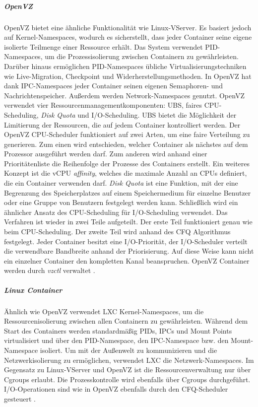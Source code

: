 \subparagraph{OpenVZ}
OpenVZ bietet eine ähnliche Funktionalität wie Linux-VServer. Es basiert jedoch auf Kernel-Namespaces, wodurch es sicherstellt, dass jeder Container seine eigene isolierte Teilmenge einer Ressource erhält. Das System verwendet PID-Namespaces, um die Prozessisolierung zwischen Containern zu gewährleisten. Darüber hinaus ermöglichen PID-Namespaces übliche Virtualisierungstechniken wie Live-Migration, Checkpoint und Widerherstellungsmethoden. In OpenVZ hat dank IPC-Namespaces jeder Container seinen eigenen Semaphoren- und Nachrichtenspeicher. Außerdem werden Network-Namespaces genutzt. OpenVZ verwendet vier Ressourcenmanagementkomponenten: \ac{UBS}, faires CPU-Scheduling, \emph{Disk Quota} und I/O-Scheduling. UBS bietet die Möglichkeit der Limitierung der Ressourcen, die auf jedem Container kontrolliert werden. Der OpenVZ CPU-Scheduler funktioniert auf zwei Arten, um eine faire Verteilung zu generieren. Zum einen wird entschieden, welcher Container als nächstes auf dem Prozessor ausgeführt werden darf. Zum anderen wird anhand einer Prioritätenliste die Reihenfolge der Prozesse des Containers erstellt. Ein weiteres Konzept ist die \ac{vCPU} \emph{affinity}, welches die maximale Anzahl an CPUs definiert, die ein Container verwenden darf. \emph{Disk Quota} ist eine Funktion, mit der eine Begrenzung des Speicherplatzes auf einem Speichermedium für einzelne Benutzer oder eine Gruppe von Benutzern festgelegt werden kann. Schließlich wird ein ähnlicher Ansatz des CPU-Scheduling für I/O-Scheduling verwendet. Das Verfahren ist wieder in zwei Teile aufgeteilt. Der erste Teil funktioniert genau wie beim CPU-Scheduling. Der zweite Teil wird anhand des \ac{CFQ} Algorithmus festgelegt. Jeder Container besitzt eine I/O-Priorität, der I/O-Scheduler verteilt die verwendbare Bandbreite anhand der Priorisierung. Auf diese Weise kann nicht ein einzelner Container den kompletten Kanal beanspruchen. OpenVZ Container werden durch \emph{vzctl} \cite{ParallelsIPHoldingsGMbH2018Vzctl} verwaltet \cite{IndexOpenvz.org} \cite{Xavier2015AClouds}.

\subparagraph{Linux Container}
Ähnlich wie OpenVZ verwendet LXC Kernel-Namespaces, um die Ressourcenisolierung zwischen allen Containern zu gewährleisten. Während dem Start des Containers werden standardmäßig PIDs, IPCs und Mount Points virtualisiert und über den PID-Namespace, den IPC-Namespace bzw. den Mount-Namespace isoliert. Um mit der Außenwelt zu kommunizieren und die Netzwerkisolierung zu ermöglichen, verwendet LXC die Netzwerk-Namespaces. Im Gegensatz zu Linux-VServer und OpenVZ ist die Ressourcenverwaltung nur über Cgroups erlaubt. Die Prozesskontrolle wird ebenfalls über Cgroups durchgeführt. I/O-Operationen sind wie in OpenVZ ebenfalls durch den CFQ-Scheduler gesteuert \cite{IndexLinuxcontainers.Org} \cite{Xavier2015AClouds}.

